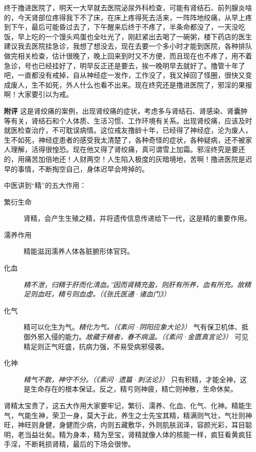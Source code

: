 \begin{case}
    终于撸进医院了，明天一大早就去医院泌尿外科检查，可能有肾结石、前列腺炎啥的，今天肾部位疼得我下不了床，在床上疼得死去活来，一阵阵地绞痛，从早上疼到下午，最后可能昏过去了，下午醒来后终于不疼了，半条命都没了，一天没吃饭，早上吃的一个馒头鸡蛋也全吐光了，刚赶紧出去喝了一碗粥，楼下药店的医生建议我去医院挂急诊，我想了想没去，现在去要一个多小时才能到医院，各种排队做完相关检查，估计很晚了，晚上回来到时又不方便，而且现在也不疼了，用不着急诊，号也已经挂好了，明早反正还是要去，挨一晚明早去就好了。撸管十年了吧，一直都没有戒掉，自从神经症一发作，工作没了，我又掉回了怪圈，很快又变成废人，生不如死，外人什么也看不出来。现在终究还是撸进医院了，邪淫的果报啊！大家要引以为戒。

    \textbf{附评} 这是肾绞痛的案例，出现肾绞痛的症状，考虑多与肾结石、肾感染、肾囊肿等有关，肾结石和个人体质、生活习惯、工作环境有关系。出现肾绞痛，应该及时就医检查治疗，不可耽误病情。这位戒友撸龄十年，已经得了神经症，沦为废人，生不如死，神经症患者的感受我太清楚了，各种奇怪的症状，各种疑病，还不被家人理解，活得很惶恐。现在他又得了肾绞痛，真可谓雪上加霜。邪淫终究是要还的，用痛苦加倍地还！人财两空！人生陷入极度的灰暗境地，苦啊！撸进医院是迟早的事情，不断掏空自己，身体迟早会垮掉的。

    中医讲到“精”的五大作用：\begin{description}
        \item[繁衍生命] 肾精，会产生生殖之精，并将遗传信息传递给下一代，这是精的重要作用。
        \item[濡养作用] 精能滋润濡养人体各脏腑形体官窍。
        \item[化血] \textit{精不泄，归精于肝而化清血。”因而肾精充盈，则肝有所养，血有所充。故精足则血旺，精亏则血虚。（《张氏医通·诸血门》）}
        \item[化气] 精可以化生为气。\textit{精化为气。（《素问·阴阳应象大论》）} 气有保卫机体、抵御外邪入侵的能力。\textit{故藏于精者，春不病温。（《素问·金匮真言论》）} 可见精足则正气旺盛，抗病力强，不易受病邪侵袭。
        \item[化神] \textit{精气不散，神守不分。（《素问·遗篇·刺法论》）} 只有积精，才能全神，这是生命存在的根本保证。反之，精亏则神疲，精亡则神散，生命休矣。
    \end{description} 肾精太宝贵了，这五大作用大家要牢记，繁衍、濡养、化血、化气、化神。精能生气，气能生神，荣卫一身，莫大于此，养生之士先宝其精，精满则气壮，气壮则神旺，神旺则身健，身健而少病，内则五藏敷华，外则肌肤润泽，容颜光彩，耳目聪明，老当益壮矣。精为身本，精为至宝，肾精就像人体的核能一样，疯狂看黄疯狂手淫，不断耗损肾精，最后的下场会很惨。
\end{case}

